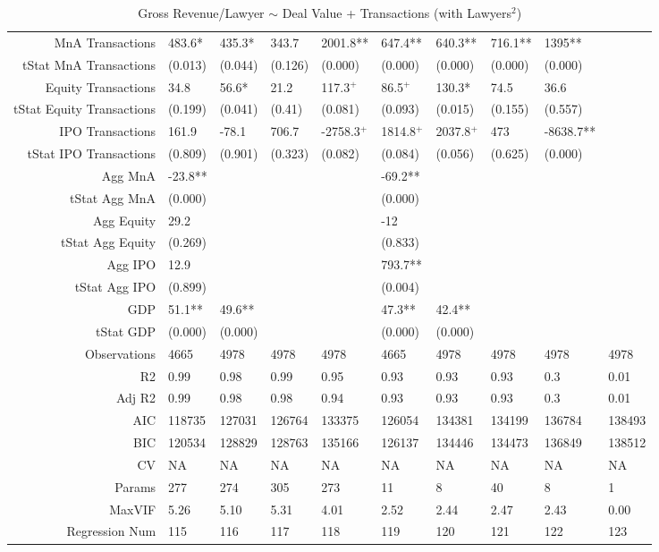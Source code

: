\begin{table}[ht]
\begin{tabular}{rlllllllll}
  MnA Transactions & 483.6* & 435.3* & 343.7 & 2001.8** & 647.4** & 640.3** & 716.1** & 1395** &  \\ 
  tStat MnA Transactions & (0.013) & (0.044) & (0.126) & (0.000) & (0.000) & (0.000) & (0.000) & (0.000) &  \\ 
  Equity Transactions & 34.8 & 56.6* & 21.2 & 117.3$^{+}$ & 86.5$^{+}$ & 130.3* & 74.5 & 36.6 &  \\ 
  tStat Equity Transactions & (0.199) & (0.041) & (0.41) & (0.081) & (0.093) & (0.015) & (0.155) & (0.557) &  \\ 
  IPO Transactions & 161.9 & -78.1 & 706.7 & -2758.3$^{+}$ & 1814.8$^{+}$ & 2037.8$^{+}$ & 473 & -8638.7** &  \\ 
  tStat IPO Transactions & (0.809) & (0.901) & (0.323) & (0.082) & (0.084) & (0.056) & (0.625) & (0.000) &  \\ 
  Agg MnA & -23.8** &  &  &  & -69.2** &  &  &  &  \\ 
  tStat Agg MnA & (0.000) &  &  &  & (0.000) &  &  &  &  \\ 
  Agg Equity & 29.2 &  &  &  & -12 &  &  &  &  \\ 
  tStat Agg Equity & (0.269) &  &  &  & (0.833) &  &  &  &  \\ 
  Agg IPO & 12.9 &  &  &  & 793.7** &  &  &  &  \\ 
  tStat Agg IPO & (0.899) &  &  &  & (0.004) &  &  &  &  \\ 
  GDP & 51.1** & 49.6** &  &  & 47.3** & 42.4** &  &  &  \\ 
  tStat GDP & (0.000) & (0.000) &  &  & (0.000) & (0.000) &  &  &  \\ 
  Observations & 4665 & 4978 & 4978 & 4978 & 4665 & 4978 & 4978 & 4978 & 4978 \\ 
  R2 & 0.99 & 0.98 & 0.99 & 0.95 & 0.93 & 0.93 & 0.93 & 0.3 & 0.01 \\ 
  Adj R2 & 0.99 & 0.98 & 0.98 & 0.94 & 0.93 & 0.93 & 0.93 & 0.3 & 0.01 \\ 
  AIC & 118735 & 127031 & 126764 & 133375 & 126054 & 134381 & 134199 & 136784 & 138493 \\ 
  BIC & 120534 & 128829 & 128763 & 135166 & 126137 & 134446 & 134473 & 136849 & 138512 \\ 
  CV & NA & NA & NA & NA & NA & NA & NA & NA & NA \\ 
  Params & 277 & 274 & 305 & 273 & 11 & 8 & 40 & 8 & 1 \\ 
  MaxVIF & 5.26 & 5.10 & 5.31 & 4.01 & 2.52 & 2.44 & 2.47 & 2.43 & 0.00 \\ 
  Regression Num & 115 & 116 & 117 & 118 & 119 & 120 & 121 & 122 & 123 \\ 
   \hline
\end{tabular}
\caption{Gross Revenue/Lawyer $\sim$ Deal Value + Transactions (with Lawyers$^2$)} 
\end{table}

